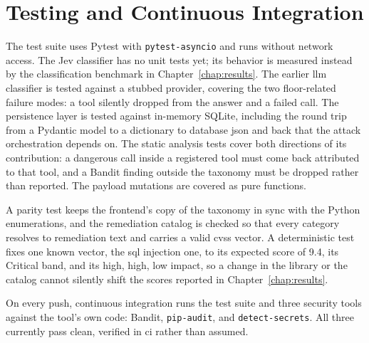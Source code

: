 \section{Testing and Continuous Integration}
\label{sec:testing}

The test suite uses Pytest with \texttt{pytest-asyncio} and runs without network access. The Jev classifier has no unit tests yet; its behavior is measured instead by the classification benchmark in Chapter~\ref{chap:results}. The earlier \gls{llm} classifier is tested against a stubbed provider, covering the two floor-related failure modes: a tool silently dropped from the answer and a failed call. The persistence layer is tested against in-memory SQLite, including the round trip from a Pydantic model to a dictionary to database \acrshort{json} and back that the attack orchestration depends on. The static analysis tests cover both directions of its contribution: a dangerous call inside a registered tool must come back attributed to that tool, and a Bandit finding outside the taxonomy must be dropped rather than reported. The payload mutations are covered as pure functions.

A parity test keeps the frontend's copy of the taxonomy in sync with the Python enumerations, and the remediation catalog is checked so that every category resolves to remediation text and carries a valid \gls{cvss} vector. A deterministic test fixes one known vector, the \acrshort{sql} injection one, to its expected score of 9.4, its Critical band, and its high, high, low impact, so a change in the library or the catalog cannot silently shift the scores reported in Chapter~\ref{chap:results}.

On every push, continuous integration runs the test suite and three security tools against the tool's own code: Bandit, \texttt{pip-audit}, and \texttt{detect-secrets}. All three currently pass clean, verified in \gls{ci} rather than assumed.
